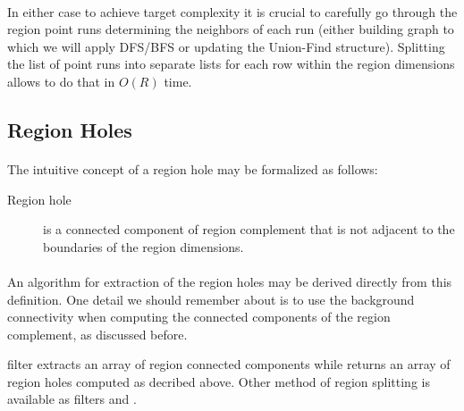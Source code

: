 \paragraph*{}
In either case to achieve target complexity it is crucial to carefully go through the region point runs determining the neighbors of each run (either building graph to which we will apply DFS/BFS or updating the Union-Find structure). Splitting the list of point runs into separate lists for each row within the region dimensions allows to do that in $O(R)$ time.

\subsection{Region Holes}

\paragraph*{}
The intuitive concept of a region hole may be formalized as follows:

\begin{description}
	\item[Region hole] is a connected component of region complement that is not adjacent to the boundaries of the region dimensions.
\end{description}

\paragraph*{}
An algorithm for extraction of the region holes may be derived directly from this definition. One detail we should remember about is to use the background connectivity when computing the connected components of the region complement, as discussed before. 

\begin{refImpl}
\studio filter  extracts an array of region connected components while  returns an array of region holes computed as decribed above. Other method of region splitting is available as filters  and .
\end{refImpl}